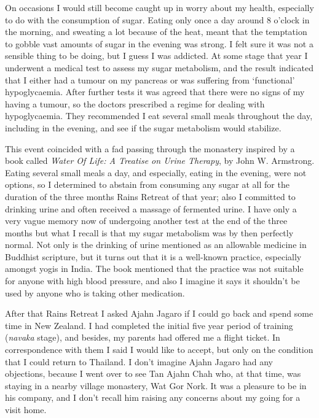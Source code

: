 On occasions I would still become caught up in worry about my health,
especially to do with the consumption of sugar. Eating only once a day
around 8 o'clock in the morning, and sweating a lot because of the heat,
meant that the temptation to gobble vast amounts of sugar in the evening
was strong. I felt sure it was not a sensible thing to be doing, but I
guess I was addicted. At some stage that year I underwent a medical test
to assess my sugar metabolism, and the result indicated that I either
had a tumour on my pancreas or was suffering from `functional'
hypoglycaemia. After further tests it was agreed that there were no
signs of my having a tumour, so the doctors prescribed a regime for
dealing with hypoglycaemia. They recommended I eat several small meals
throughout the day, including in the evening, and see if the sugar
metabolism would stabilize.

This event coincided with a fad passing through the monastery inspired
by a book called \emph{Water Of Life: A Treatise on Urine Therapy}, by
John W. Armstrong. Eating several small meals a day, and especially,
eating in the evening, were not options, so I determined to abstain from
consuming any sugar at all for the duration of the three months Rains
Retreat of that year; also I committed to drinking urine and often
received a massage of fermented urine. I have only a very vague memory
now of undergoing another test at the end of the three months but what I
recall is that my sugar metabolism was by then perfectly normal. Not
only is the drinking of urine mentioned as an allowable medicine in
Buddhist scripture, but it turns out that it is a well-known practice,
especially amongst yogis in India. The book mentioned that the practice
was not suitable for anyone with high blood pressure, and also I imagine
it says it shouldn't be used by anyone who is taking other medication.

After that Rains Retreat I asked Ajahn Jagaro if I could go back and
spend some time in New Zealand. I had completed the initial five year
period of training (\emph{navaka} stage), and besides, my parents had
offered me a flight ticket. In correspondence with them I said I would
like to accept, but only on the condition that I could return to
Thailand. I don't imagine Ajahn Jagaro had any objections, because I
went over to see Tan Ajahn Chah who, at that time, was staying in a
nearby village monastery, Wat Gor Nork. It was a pleasure to be in his
company, and I don't recall him raising any concerns about my going for
a visit home.

